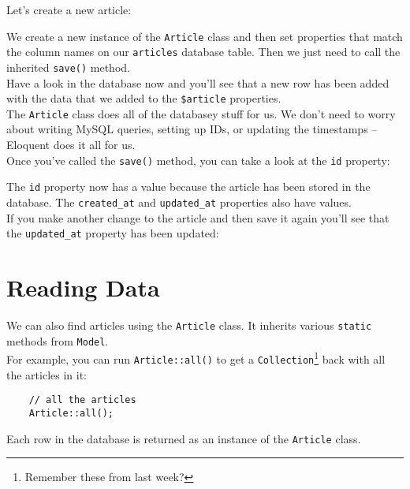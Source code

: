 Let's create a new article:


We create a new instance of the \texttt{Article} class and then set properties that match the column names on our \texttt{articles} database table. Then we just need to call the inherited \texttt{save()} method.
\\

Have a look in the database now and you'll see that a new row has been added with the data that we added to the \texttt{\$article} properties.
\\

The \texttt{Article} class does all of the databasey stuff for us. We don't need to worry about writing MySQL queries, setting up IDs, or updating the timestamps – Eloquent does it all for us.
\\

Once you've called the \texttt{save()} method, you can take a look at the \texttt{id} property:


The \texttt{id} property now has a value because the article has been stored in the database. The \texttt{created\_at} and \texttt{updated\_at} properties also have values.
\\

If you make another change to the article and then save it again you'll see that the \texttt{updated\_at} property has been updated:



\section{Reading Data}

We can also find articles using the \texttt{Article} class. It inherits various \texttt{static} methods from \texttt{Model}.
\\

For example, you can run \texttt{Article::all()} to get a \texttt{Collection}\footnote{Remember these from last week?} back with all the articles in it:

\begin{verbatim}
    // all the articles
    Article::all();
\end{verbatim}

Each row in the database is returned as an instance of the \texttt{Article} class.
\\

